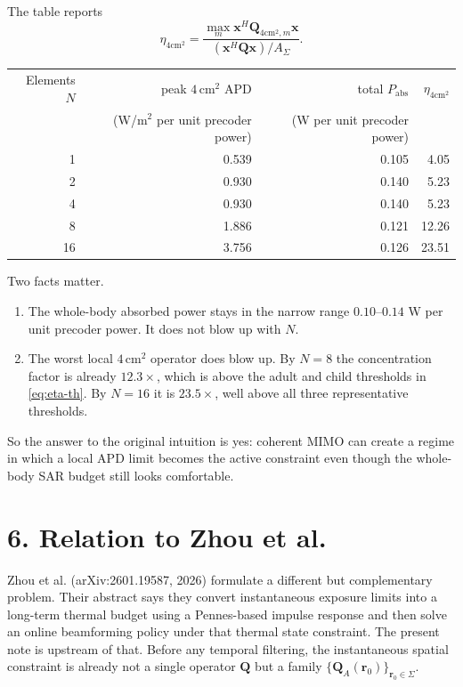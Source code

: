 \documentclass[11pt]{article}
\newcommand{\rr}{\mathbf{r}}
\newcommand{\x}{\mathbf{x}}
\newcommand{\Q}{\mathbf{Q}}
\begin{document}
The table reports
\begin{equation}
  \eta_{4\mathrm{cm}^2}
  =
  \frac{\max_m \x^H \Q_{4\mathrm{cm}^2,m}\x}
       {(\x^H \Q \x)/A_\Sigma}.
\end{equation}

\begin{center}
\begin{tabular}{rrrr}
\toprule
Elements $N$ & peak $4\,\mathrm{cm}^2$ APD & total $P_{\mathrm{abs}}$ & $\eta_{4\mathrm{cm}^2}$ \\
& (W/m$^2$ per unit precoder power) & (W per unit precoder power) & \\
\midrule
1  & 0.539 & 0.105 & 4.05 \\
2  & 0.930 & 0.140 & 5.23 \\
4  & 0.930 & 0.140 & 5.23 \\
8  & 1.886 & 0.121 & 12.26 \\
16 & 3.756 & 0.126 & 23.51 \\
\bottomrule
\end{tabular}
\end{center}

Two facts matter.

\begin{enumerate}
  \item The whole-body absorbed power stays in the narrow range
        $0.10$--$0.14$ W per unit precoder power. It does not blow up with $N$.
  \item The worst local $4\,\mathrm{cm}^2$ operator does blow up. By $N=8$ the
        concentration factor is already $12.3\times$, which is above the adult
        and child thresholds in \eqref{eq:eta-th}. By $N=16$ it is
        $23.5\times$, well above all three representative thresholds.
\end{enumerate}

So the answer to the original intuition is yes: coherent MIMO can create a
regime in which a local APD limit becomes the active constraint even though the
whole-body SAR budget still looks comfortable.

\section*{6. Relation to Zhou et al.}

Zhou et al. (arXiv:2601.19587, 2026) formulate a different but complementary
problem. Their abstract says they convert instantaneous exposure limits into a
long-term thermal budget using a Pennes-based impulse response and then solve an
online beamforming policy under that thermal state constraint. The present note
is upstream of that. Before any temporal filtering, the instantaneous spatial
constraint is already not a single operator $\Q$ but a family
$\{\Q_A(\rr_0)\}_{\rr_0 \in \Sigma}$.
\end{document}
